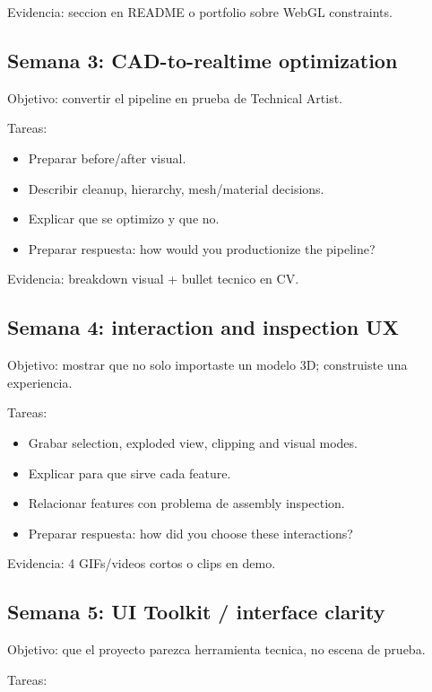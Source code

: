 Evidencia: seccion en README o portfolio sobre WebGL constraints.


\subsection{Semana 3: CAD-to-realtime optimization}


Objetivo: convertir el pipeline en prueba de Technical Artist.


Tareas:


\begin{itemize}
\item Preparar before/after visual.
\item Describir cleanup, hierarchy, mesh/material decisions.
\item Explicar que se optimizo y que no.
\item Preparar respuesta: how would you productionize the pipeline?
\end{itemize}


Evidencia: breakdown visual + bullet tecnico en CV.


\subsection{Semana 4: interaction and inspection UX}


Objetivo: mostrar que no solo importaste un modelo 3D; construiste una experiencia.


Tareas:


\begin{itemize}
\item Grabar selection, exploded view, clipping and visual modes.
\item Explicar para que sirve cada feature.
\item Relacionar features con problema de assembly inspection.
\item Preparar respuesta: how did you choose these interactions?
\end{itemize}


Evidencia: 4 GIFs/videos cortos o clips en demo.


\subsection{Semana 5: UI Toolkit / interface clarity}


Objetivo: que el proyecto parezca herramienta tecnica, no escena de prueba.


Tareas:


